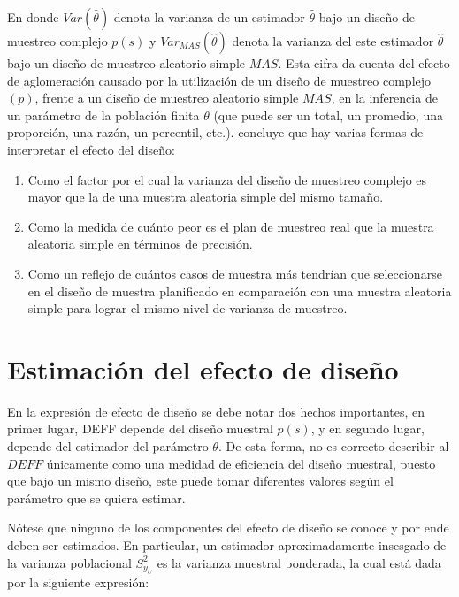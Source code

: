 \documentclass[
  12pt,
]{book}
\providecommand{\tightlist}{%
  \setlength{\itemsep}{0pt}\setlength{\parskip}{0pt}}
\begin{document}
En donde \(Var(\hat{\theta})\) denota la varianza de un estimador \(\hat{\theta}\) bajo un diseño de muestreo complejo \(p(s)\) y \(Var_{MAS}(\hat{\theta})\) denota la varianza del este estimador \(\hat{\theta}\) bajo un diseño de muestreo aleatorio simple \(MAS\). Esta cifra da cuenta del efecto de aglomeración causado por la utilización de un diseño de muestreo complejo \((p)\), frente a un diseño de muestreo aleatorio simple \(MAS\), en la inferencia de un parámetro de la población finita \(\theta\) (que puede ser un total, un promedio, una proporción, una razón, un percentil, etc.). \citet[p.~49]{United_Nations_2008} concluye que hay varias formas de interpretar el efecto del diseño:

\begin{enumerate}
\def\labelenumi{\arabic{enumi}.}
\tightlist
\item
  Como el factor por el cual la varianza del diseño de muestreo complejo es mayor que la de una muestra aleatoria simple del mismo tamaño.
\item
  Como la medida de cuánto peor es el plan de muestreo real que la muestra aleatoria simple en términos de precisión.
\item
  Como un reflejo de cuántos casos de muestra más tendrían que seleccionarse en el diseño de muestra planificado en comparación con una muestra aleatoria simple para lograr el mismo nivel de varianza de muestreo.
\end{enumerate}

\hypertarget{estimaciuxf3n-del-efecto-de-diseuxf1o}{%
\section{Estimación del efecto de diseño}\label{estimaciuxf3n-del-efecto-de-diseuxf1o}}

En la expresión de efecto de diseño se debe notar dos hechos importantes, en primer lugar, DEFF depende del diseño muestral \(p(s)\), y en segundo lugar, depende del estimador del parámetro \(\theta\). De esta forma, no es correcto describir al \(DEFF\) únicamente como una medidad de eficiencia del diseño muestral, puesto que bajo un mismo diseño, este puede tomar diferentes valores según el parámetro que se quiera estimar.

Nótese que ninguno de los componentes del efecto de diseño se conoce y por ende deben ser estimados. En particular, un estimador aproximadamente insesgado de la varianza poblacional \(S^2_{y_U}\) es la varianza muestral ponderada, la cual está dada por la siguiente expresión:
\end{document}
